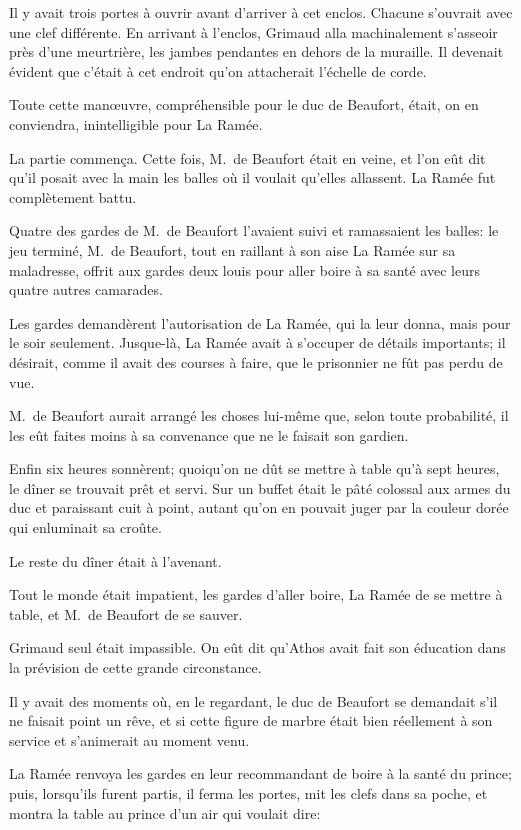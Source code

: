Il y avait trois portes à ouvrir avant d'arriver à cet enclos. Chacune s'ouvrait avec une clef différente.
En arrivant à l'enclos, Grimaud alla machinalement s'asseoir près d'une meurtrière, les jambes pendantes en dehors de la muraille. Il devenait évident que c'était à cet endroit qu'on attacherait l'échelle de corde.

Toute cette manœuvre, compréhensible pour le duc de Beaufort, était, on en conviendra, inintelligible pour La Ramée.

La partie commença. Cette fois, M.~de Beaufort était en veine, et l'on eût dit qu'il posait avec la main les balles où il voulait qu'elles allassent. La Ramée fut complètement battu.

Quatre des gardes de M.~de Beaufort l'avaient suivi et ramassaient les balles: le jeu terminé, M.~de Beaufort, tout en raillant à son aise La Ramée sur sa maladresse, offrit aux gardes deux louis pour aller boire à sa santé avec leurs quatre autres camarades.

Les gardes demandèrent l'autorisation de La Ramée, qui la leur donna, mais pour le soir seulement. Jusque-là, La Ramée avait à s'occuper de détails importants; il désirait, comme il avait des courses à faire, que le prisonnier ne fût pas perdu de vue.

M.~de Beaufort aurait arrangé les choses lui-même que, selon toute probabilité, il les eût faites moins à sa convenance que ne le faisait son gardien.

Enfin six heures sonnèrent; quoiqu'on ne dût se mettre à table qu'à sept heures, le dîner se trouvait prêt et servi. Sur un buffet était le pâté colossal aux armes du duc et paraissant cuit à point, autant qu'on en pouvait juger par la couleur dorée qui enluminait sa croûte.

Le reste du dîner était à l'avenant.

Tout le monde était impatient, les gardes d'aller boire, La Ramée de se mettre à table, et M.~de Beaufort de se sauver.

Grimaud seul était impassible. On eût dit qu'Athos avait fait son éducation dans la prévision de cette grande circonstance.

Il y avait des moments où, en le regardant, le duc de Beaufort se demandait s'il ne faisait point un rêve, et si cette figure de marbre était bien réellement à son service et s'animerait au moment venu.

La Ramée renvoya les gardes en leur recommandant de boire à la santé du prince; puis, lorsqu'ils furent partis, il ferma les portes, mit les clefs dans sa poche, et montra la table au prince d'un air qui voulait dire:

